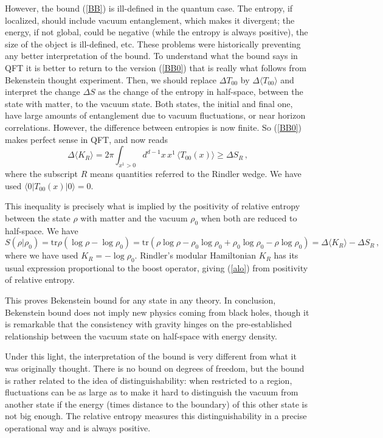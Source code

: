 \documentclass[11pt,a4paper]{article}
\numberwithin{equation}{section}
\newcommand{\be}{\begin{equation}}
\newcommand{\ee}{\end{equation}}
\begin{document}
However, the bound (\ref{BB}) is ill-defined in the quantum case. The entropy, if localized, should include vacuum entanglement, which makes it divergent; the energy, if not global, could be negative (while the entropy is always positive), the size of the object is ill-defined, etc. These problems were historically preventing any better interpretation of the bound. To understand what the bound says in QFT it is better to return to the version (\ref{BB0}) that is really what follows from Bekenstein thought experiment. Then, we should replace $\Delta T_{00}$ by $\Delta \langle T_{00}\rangle $ and interpret the change $\Delta S$ as the change of the entropy in half-space, between the state with matter, to the vacuum state. Both states, the initial and final one, have large amounts of entanglement due to vacuum fluctuations, or near horizon correlations. However, the difference between entropies is now finite. So (\ref{BB0}) makes perfect sense in QFT, and now reads
\be
\Delta \langle K_R \rangle= 2\pi \int_{x^1> 0}d^{d-1}x\,  x^1\,  \langle T_{00}(x)\rangle \ge \Delta S_R\,,           \label{alo}
\ee
where the subscript $R$ means quantities referred to the Rindler wedge. We have used $\langle 0|T_{00}(x)|0\rangle=0$. 

This inequality is precisely what is implied by the positivity of relative entropy between the state $\rho$ with matter and the vacuum $\rho_0$ when both are reduced to half-space. We have
\be
S(\rho|\rho_0)=\textrm{tr} \rho (\log \rho -\log \rho_0)= \textrm{tr} \left(\rho \log \rho -\rho_0\log \rho_0 + \rho_0\log \rho_0-\rho \log \rho_0\right)=\Delta \langle K_R \rangle - \Delta S_R\,,
\ee
where we have used $K_R=-\log \rho_0$. Rindler's modular Hamiltonian $K_R$ has its usual expression proportional to the boost operator, giving (\ref{alo}) from positivity of relative entropy.

This proves Bekenstein bound for any state in any theory. In conclusion, Bekenstein bound does not imply new physics coming from black holes, though it is remarkable that the consistency with gravity hinges on the pre-established relationship between the vacuum state on half-space with energy density.      

Under this light, the interpretation of the bound is very different from what it was originally thought. There is no bound on degrees of freedom, but the bound is rather related to the idea of distinguishability: when restricted to a region, fluctuations can be as large as to make it hard to distinguish the vacuum from another state if the energy (times distance to the boundary) of this other state is not big enough. The relative entropy measures this distinguishability in a precise operational way and is always positive.     
\end{document}
